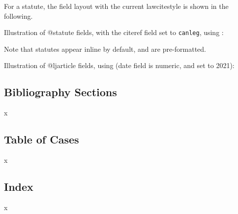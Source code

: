 For a statute, the field layout with the current lawcitestyle is shown in the following.

Illustration of @statute fields, with the citeref field set to \texttt{canleg}, using : 

Note that statutes appear inline by default, and are pre-formatted.

Illustration of @ljarticle fields, using  (date field is numeric, and set to 2021): 


\subsection{Bibliography Sections}
x
\subsection{Table of Cases}
x
\subsection{Index}
x




